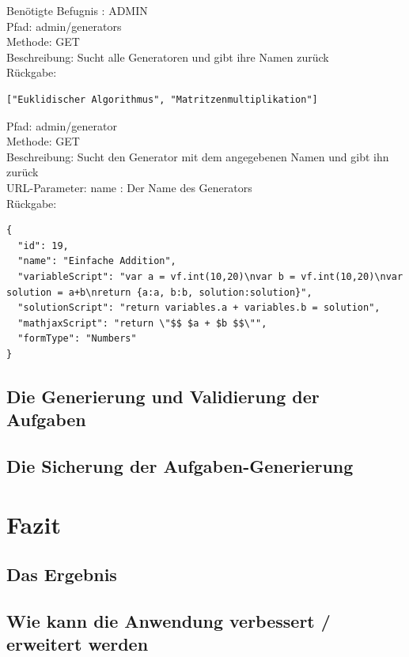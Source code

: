 Benötigte Befugnis : ADMIN \\

\noindent Pfad: admin/generators \\
Methode: GET \\
Beschreibung: Sucht alle Generatoren und gibt ihre Namen zurück \\
Rückgabe: \begin{lstlisting} 
["Euklidischer Algorithmus", "Matritzenmultiplikation"]
\end{lstlisting}

\noindent Pfad: admin/generator \\
Methode: GET \\
Beschreibung: Sucht den Generator mit dem angegebenen Namen und gibt ihn zurück \\
URL-Parameter: name : Der Name des Generators \\
Rückgabe: \begin{lstlisting} 
{
  "id": 19,
  "name": "Einfache Addition",
  "variableScript": "var a = vf.int(10,20)\nvar b = vf.int(10,20)\nvar solution = a+b\nreturn {a:a, b:b, solution:solution}",
  "solutionScript": "return variables.a + variables.b = solution",
  "mathjaxScript": "return \"$$ $a + $b $$\"",
  "formType": "Numbers"
}
\end{lstlisting}


\section{Die Generierung und Validierung der Aufgaben}

\section{Die Sicherung der Aufgaben-Generierung}



\chapter{Fazit}




\section{Das Ergebnis}


\section{Wie kann die Anwendung verbessert / erweitert werden}

